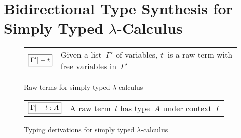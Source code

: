 
\section{Bidirectional Type Synthesis for Simply Typed \texorpdfstring{$\lambda$}{λ}-Calculus} \label{sec:key-ideas}

\begin{figure}
  \small
  \bgroup
  \renewcommand{\arraystretch}{1.5}
  \begin{tabular}{ r l }
    $\boxed{\Gamma' |- \isTerm{t}}$ & Given a list~$\Gamma'$ of variables, $t$~is a raw term with free variables in~$\Gamma'$
  \end{tabular}
  \egroup
  \centering
  \caption{Raw terms for simply typed $\lambda$-calculus}
  \label{fig:STLC-raw-terms}
\end{figure}

\begin{figure}
  \small
  \bgroup
  \renewcommand{\arraystretch}{1.5}
  \begin{tabular}{ r l }
    $\boxed{\Gamma |- \isTerm{t} : A}$ & A raw term~$t$ has type~$A$ under context~$\Gamma$
  \end{tabular}
  \egroup
  \centering
  \caption{Typing derivations for simply typed $\lambda$-calculus}
  \label{fig:STLC-typing-derivations}
\end{figure}

